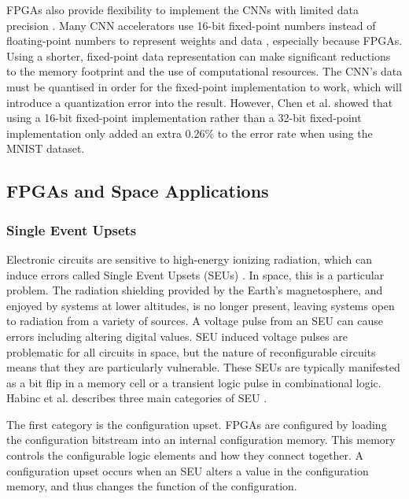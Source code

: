 \documentclass[12pt]{article}
\begin{document}
FPGAs also provide flexibility to implement the CNNs with limited data precision \cite{SudaFpgaAccelerator}. Many CNN accelerators use 16-bit fixed-point numbers instead of floating-point numbers to represent weights and data \cite{ZhangFpgaAccelerator}\cite{ChenFpgaAccelerator}\cite{FarabetFpgaAccelerator}, especially because FPGAs. Using a shorter, fixed-point data representation can make significant reductions to the memory footprint and the use of computational resources. The CNN's data must be quantised in order for the fixed-point implementation to work, which will introduce a quantization error into the result. However, Chen et al. showed that using a 16-bit fixed-point implementation rather than a 32-bit fixed-point implementation only added an extra 0.26\% to the error rate when using the MNIST dataset.

\subsection{FPGAs and Space Applications}
\label{sec:Background-FPGAsAndSpaceApplications}

\subsubsection{Single Event Upsets}
\label{sec:Background-FPGAsAndSpaceApplications-SEUs}

Electronic circuits are sensitive to high-energy ionizing radiation, which can induce errors called Single Event Upsets (SEUs) \cite{SeuTutorial}. In space, this is a particular problem. The radiation shielding provided by the Earth's magnetosphere, and enjoyed by systems at lower altitudes, is no longer present, leaving systems open to radiation from a  variety of sources. A voltage pulse from an SEU can cause errors including altering digital values. SEU induced voltage pulses are problematic for all circuits in space, but the nature of reconfigurable circuits means that they are particularly vulnerable. These SEUs are typically manifested as a bit flip in a memory cell or a transient logic pulse in combinational logic. Habinc et al. describes three main categories of SEU \cite{SuitabilityGaisler}.

The first category is the configuration upset. FPGAs are configured by loading the configuration bitstream into an internal configuration memory. This memory controls the configurable logic elements and how they connect together. A configuration upset occurs when an SEU alters a value in the configuration memory, and thus changes the function of the configuration. 
\end{document}
